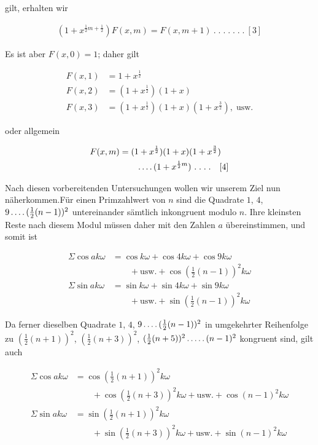 gilt, erhalten wir

\[
\begin{aligned}
(1+x^{\frac12m+\frac12})F(x,m)=F(x,m+1)\ .\; .\; .\; .\; .\; .\; .\ [3]
\end{aligned}
\]

Es ist aber $F(x,0)=1$; daher gilt

\[
\begin{aligned}
F(x,1)&=1+x^{\frac12}\\
F(x,2)&=(1+x^{\frac12})(1+x)\\
F(x,3)&=(1+x^{\frac12})(1+x)(1+x^{\frac32}),\;\text{usw.}
\end{aligned}
\]

oder allgemein

\[
\begin{aligned}
F(x,m)&=(1+x^{\frac12})(1+x)(1+x^{\frac32})\\&\qquad\dotsfour(1+x^{\frac12m})\ .\; .\; .\; .\quad[4]
\end{aligned}
\]


Nach diesen vorbereitenden Untersuchungen wollen wir unserem Ziel nun näherkommen.\quad Für einen Primzahlwert von $n$ sind die Quadrate $1$, $4$, $9\mathinner{.\,.\,.\,.}(\frac12(n-1))^2$ untereinander sämtlich inkongruent modulo $n$. Ihre kleinsten Reste nach diesem Modul müssen daher mit den Zahlen $a$ übereinstimmen, und somit ist

\[
\begin{aligned}
\Sigma\cos ak\omega&=\cos k\omega+\cos4k\omega+\cos9k\omega\\&\qquad+\text{usw.}+\cos(\tfrac12(n-1))^2k\omega\\
\Sigma\sin ak\omega&=\sin k\omega+\sin4k\omega+\sin9k\omega\\&\qquad+\text{usw.}+\sin(\tfrac12(n-1))^2k\omega
\end{aligned}
\]

Da ferner dieselben Quadrate $1$, $4$, $9\mathinner{.\,.\,.\,.}(\frac12(n-1))^2$ in umgekehrter Reihenfolge zu $(\frac12(n+1))^2$, $(\frac12(n+3))^2$, $(\frac12(n+5))^2\mathinner{.\,.\,.\,.\,.}(n-1)^2$ kongruent sind, gilt auch


\[
\begin{aligned}
\Sigma\cos ak\omega&=\cos(\tfrac12(n+1))^2k\omega\\&\qquad+\cos(\tfrac12(n+3))^2k\omega+\text{usw.}+\cos(n-1)^2k\omega\\
\Sigma\sin ak\omega&=\sin(\tfrac12(n+1))^2k\omega\\&\qquad+\sin(\tfrac12(n+3))^2k\omega+\text{usw.}+\sin(n-1)^2k\omega
\end{aligned}
\]

